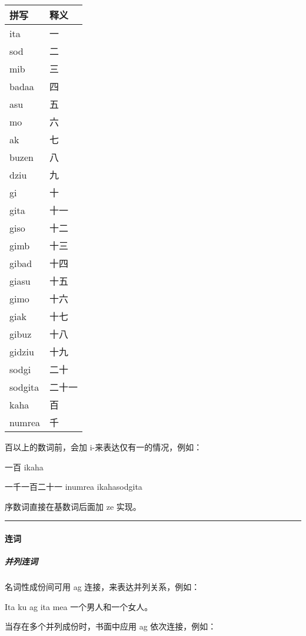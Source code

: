 \documentclass{article}
\begin{document}
\begin{longtable}[]{@{}ll@{}}
\toprule\noalign{}
拼写 & 释义 \\
\midrule\noalign{}
\endhead
\bottomrule\noalign{}
\endlastfoot
ita & 一 \\
sod & 二 \\
mib & 三 \\
badaa & 四 \\
asu & 五 \\
mo & 六 \\
ak & 七 \\
buzen & 八 \\
dziu & 九 \\
gi & 十 \\
gita & 十一 \\
giso & 十二 \\
gimb & 十三 \\
gibad & 十四 \\
giasu & 十五 \\
gimo & 十六 \\
giak & 十七 \\
gibuz & 十八 \\
gidziu & 十九 \\
sodgi & 二十 \\
sodgita & 二十一 \\
kaha & 百 \\
numrea & 千 \\
\end{longtable}

百以上的数词前，会加 i-来表达仅有一的情况，例如：

一百 ikaha

一千一百二十一 inumrea ikahasodgita

序数词直接在基数词后面加 ze 实现。

\begin{center}\rule{0.5\linewidth}{0.5pt}\end{center}

\paragraph{连词}\label{ux8fdeux8bcd}

\subparagraph{并列连词}\label{ux5e76ux5217ux8fdeux8bcd}

名词性成份间可用 ag 连接，来表达并列关系，例如：

Ita ku ag ita mea 一个男人和一个女人。

当存在多个并列成份时，书面中应用 ag 依次连接，例如：
\end{document}
